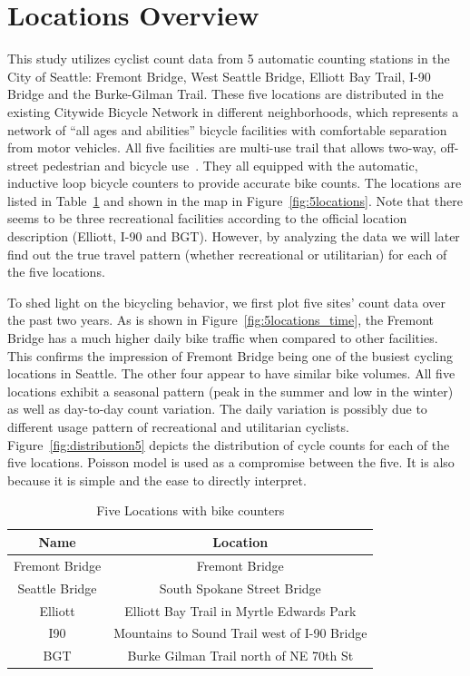 \documentclass [11pt, proquest] {uwthesis}[2015/03/03]
\begin{document}
\section{Locations Overview}

This study utilizes cyclist count data from 5 automatic counting stations in the City of Seattle: Fremont Bridge, West Seattle Bridge, Elliott Bay Trail, I-90 Bridge and the Burke-Gilman Trail. These five locations are distributed in the existing Citywide Bicycle Network in different neighborhoods, which represents a network of “all ages and abilities” bicycle facilities with comfortable separation from motor vehicles. All five facilities are multi-use trail that allows two-way, off-street pedestrian and bicycle use~\cite{SDOT_BMP15}. They all equipped with the automatic, inductive loop bicycle counters to provide accurate bike counts. The locations are listed in Table~\ref{tbl:locationd} and shown in the map in Figure~\ref{fig:5locations}. Note that there seems to be three recreational facilities according to the official location description (Elliott, I-90 and BGT). However, by analyzing the data we will later find out the true travel pattern (whether recreational or utilitarian) for each of the five locations.

To shed light on the bicycling behavior, we first plot five sites' count data over the past two years. As is shown in Figure~\ref{fig:5locations_time}, the Fremont Bridge has a much higher daily bike traffic when compared to other facilities. This confirms the impression of Fremont Bridge being one of the busiest cycling locations in Seattle. The other four appear to have similar bike volumes. All five locations exhibit a seasonal pattern (peak in the summer and low in the winter) as well as day-to-day count variation. The daily variation is possibly due to different usage pattern of recreational and utilitarian cyclists. Figure~\ref{fig:distribution5} depicts the distribution of cycle counts for each of the five locations. Poisson model is used as a compromise between the five. It is also because it is simple and the ease to directly interpret. 

\begin{table}
 \centering 
  \caption{Five Locations with bike counters} 
\small
\begin{tabular}{ c | c } 
\hline 
  Name & Location \\ 
\hline
  Fremont Bridge & Fremont Bridge  \\
  Seattle Bridge & South Spokane Street Bridge  \\
  Elliott & Elliott Bay Trail in Myrtle Edwards Park  \\ 
  I90 & Mountains to Sound Trail west of I-90 Bridge \\ 
  BGT & Burke Gilman Trail north of NE 70th St\\ 
\hline 
\end{tabular} 
\label{tbl:locationd}
\end{table} 
\end{document}
